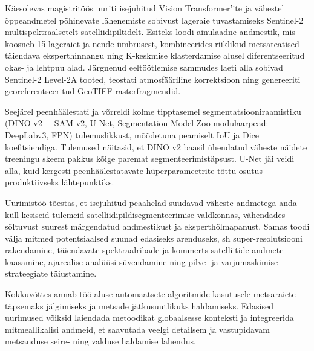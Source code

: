 Käesolevas magistritöös uuriti isejuhitud Vision Transformer'ite ja vähestel
õppeandmetel põhinevate lähenemiste sobivust lageraie tuvastamiseks Sentinel-2
multispektraalsetelt satelliidipiltidelt. Esiteks loodi ainulaadne andmestik,
mis koosneb 15 lageraiet ja nende ümbrusest, kombineerides riiklikud
metsateatised täiendava eksperthinnangu ning K-keskmise klasterdamise alusel
diferentseeritud okas- ja lehtpuu alad. Järgnenud eeltöötlemise sammudes laeti
alla sobivad Sentinel-2 Level-2A tooted, teostati atmosfääriline korrektsioon
ning genereeriti georeferentseeritud GeoTIFF rasterfragmendid.

Seejärel peenhäälestati ja võrreldi kolme tipptasemel segmentatsiooniraamistiku
(DINO v2 + SAM v2, U-Net, Segmentation Model Zoo modulaarpead: DeepLabv3, FPN)
tulemuslikkust, mõõdetuna peamiselt IoU ja Dice koefitsiendiga. Tulemused
näitasid, et DINO v2 baasil ühendatud väheste näidete treeningu skeem
pakkus kõige paremat segmenteerimistäpsust. U-Net jäi veidi alla, kuid
kergesti peenhäälestatavate hüperparameetrite tõttu osutus produktiivseks
lähtepunktiks.

Uurimistöö tõestas, et isejuhitud peaahelad suudavad väheste andmetega anda
küll kesiseid tulemeid satelliidipildisegmenteerimise valdkonnas,
vähendades sõltuvust suurest märgendatud andmestikust ja eksperthõlmapanust.
Samas toodi välja mitmed potentsiaalsed suunad edasiseks arenduseks, sh
super-resolutsiooni rakendamine, täiendavate spektraalribade ja
kommerts-satelliitide andmete kaasamine, ajarealise analüüsi süvendamine ning
pilve- ja varjumaskimise strateegiate täiustamine.

Kokkuvõttes annab töö aluse automaatsete algoritmide kasutusele metsaraiete
täpsemaks jälgimiseks ja metsade jätkusuutlikuks haldamiseks. Edasised uurimused
võiksid laiendada metoodikat globaalsesse konteksti ja integreerida
mitmeallikalisi andmeid, et saavutada veelgi detailsem ja vastupidavam
metsanduse seire- ning valduse haldamise lahendus.

